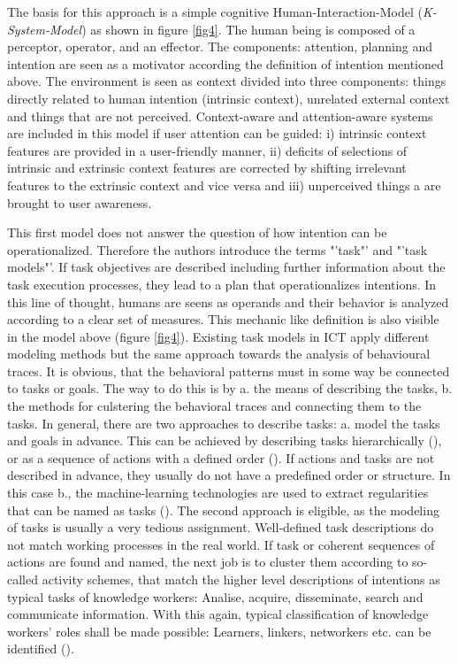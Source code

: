 The basis for this approach is a simple cognitive Human-Interaction-Model (\textit{K-System-Model}) as shown in figure \ref{fig4}. The human being is composed of a perceptor, operator, and an effector. The components: attention, planning and intention are seen as a motivator according the definition of intention mentioned above. The environment is seen as context divided into three components: things directly related to human intention (intrinsic context), unrelated external context and things that are not perceived. Context-aware and attention-aware systems are included in this model if user attention can be guided: i) intrinsic context features are provided in a user-friendly manner, ii) deficits of selections of intrinsic and extrinsic context features are corrected by shifting irrelevant features to the extrinsic context and vice versa and iii) unperceived things a are brought to user awareness. 

This first model does not answer the question of how intention can be operationalized. Therefore the authors introduce the terms "'task"' and "'task models"'. If task objectives are described including further information about the task execution processes, they lead to a plan that operationalizes intentions.  In this line of thought, humans are seens as operands and their behavior is analyzed according to a clear set of measures. This mechanic like definition is also visible in the model above (figure \ref{fig4}). Existing task models in \ac{ICT} apply different modeling methods but the same approach towards the analysis of behavioural traces. It is obvious, that the behavioral patterns must in some way be connected to tasks or goals. The way to do this is by a. the means of describing the tasks, b. the methods for culstering the behavioral traces and connecting them to the tasks. In general, there are two approaches to describe tasks: a. model the tasks and goals in advance. This can be achieved by describing tasks hierarchically (\cite{newell1972human}), or as a sequence of actions with a defined order  (\cite{eder1995workflow}). If actions and tasks are not described in advance, they usually do not have a predefined order or structure. In this case b., the machine-learning technologies are used to extract regularities that can be named as tasks (\cite{schmitz2011contextualized}). The second approach is eligible, as the modeling of tasks is usually a very tedious assignment. Well-defined task descriptions do not match working processes in the real world. If task or coherent sequences of actions are found and named, the next job is to cluster them according to so-called activity schemes, that match the higher level descriptions of intentions as typical tasks of knowledge workers: Analise, acquire, disseminate, search and communicate information. With this again, typical classification of knowledge workers' roles shall be made possible: Learners, linkers, networkers etc. can be identified (\cite{reinhardt2011knowledge}). 

